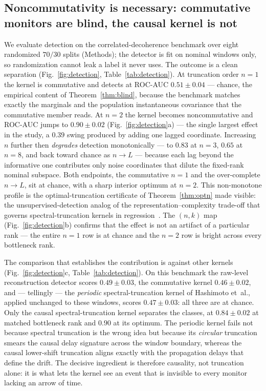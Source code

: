 \documentclass[
  aps,
  prresearch,
  reprint,
  amsmath,
  amssymb,
  nofootinbib,
  floatfix,
]{revtex4-2}
\begin{document}
\subsection{Noncommutativity is necessary: commutative monitors are blind, the
causal kernel is not}

We evaluate detection on the correlated-decoherence benchmark over eight randomized
$70/30$ splits (Methods); the detector is fit on nominal windows only, so
randomization cannot leak a label it never uses. The outcome is a clean separation
(Fig.~\ref{fig:detection}, Table~\ref{tab:detection}). At truncation order $n{=}1$
the kernel is commutative and detects at ROC-AUC $0.51\pm0.04$ --- chance, the
empirical content of Theorem~\ref{thm:blind}, because the benchmark matches exactly
the marginals and the population instantaneous covariance that the commutative
member reads. At $n{=}2$ the kernel becomes noncommutative and ROC-AUC jumps to
$0.90\pm0.02$ (Fig.~\ref{fig:detection}a) --- the single largest effect in the study,
a $0.39$ swing produced by adding one lagged coordinate. Increasing $n$ further then
\emph{degrades} detection monotonically --- to $0.83$ at $n{=}3$, $0.65$ at $n{=}8$,
and back toward chance as $n\to L$ --- because each lag beyond the informative one
contributes only noise coordinates that dilute the fixed-rank nominal subspace. Both
endpoints, the commutative $n{=}1$ and the over-complete $n\to L$, sit at chance,
with a sharp interior optimum at $n{=}2$. This non-monotone profile is the
optimal-truncation certificate of Theorem~\ref{thm:optn} made visible: the
unsupervised-detection analog of the representation--complexity trade-off that
governs spectral-truncation kernels in
regression~\citep{hashimoto2024spectral}. The $(n,k)$ map
(Fig.~\ref{fig:detection}b) confirms that the effect is not an artifact of a
particular rank --- the entire $n{=}1$ row is at chance and the $n{=}2$ row is bright
across every bottleneck rank.

The comparison that establishes the contribution is against other kernels
(Fig.~\ref{fig:detection}c, Table~\ref{tab:detection}). On this benchmark the
raw-level reconstruction detector scores $0.49\pm0.03$, the commutative kernel
$0.46\pm0.02$, and --- tellingly --- the \emph{periodic} spectral-truncation kernel of
Hashimoto et~al., applied unchanged to these windows, scores $0.47\pm0.03$: all
three are at chance. Only the causal spectral-truncation kernel separates the
classes, at $0.84\pm0.02$ at matched bottleneck rank and $0.90$ at its optimum. The
periodic kernel fails not because spectral truncation is the wrong idea but because
its \emph{circular} truncation smears the causal delay signature across the window
boundary, whereas the causal lower-shift truncation aligns exactly with the
propagation delays that define the drift. The decisive ingredient is therefore
causality, not truncation alone: it is what lets the kernel see an event that is
invisible to every monitor lacking an arrow of time.
\end{document}
